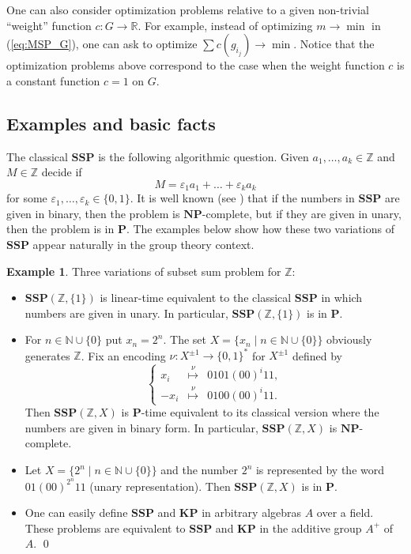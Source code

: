 \documentclass[10pt]{amsart}
\theoremstyle{definition}
\newtheorem{example}[theorem]{Example}
\def\P{{\mathbf{P}}}
\def\NP{{\mathbf{NP}}}
\def\SSP{{\mathbf{SSP}}}
\def\KP{{\mathbf{KP}}}
\begin{document}
\medskip

One can also consider optimization problems relative to  a given non-trivial ``weight'' function $c:G \to \mathbb{R}$. For example, instead of optimizing $m\to\min$ in (\ref{eq:MSP_G}), one can ask to optimize $\sum c(g_{i_j})\to\min$. Notice that the optimization problems above correspond to the case when the weight function $c$ is a constant function $c = 1$ on $G$.





\subsection{Examples and basic facts}
\label{sec:general-properties}

The classical $\SSP$  is the following algorithmic question.
Given $a_1,\ldots,a_k\in \mathbb Z$ and $M\in \mathbb Z$ decide if
    $$M=\varepsilon_1 a_1+\ldots+\varepsilon_k a_k$$
for some $\varepsilon_1,\ldots,\varepsilon_k \in \{0,1\}$.
It is well known (see \cite{GJ,Papa,Papadimitriou-Steiglitz:1998})
that if the numbers in $\SSP$ are given in  binary, then
the problem is $\NP$-complete, but if they are given in unary,
then the problem is  in $\P$. The examples below show how these
two variations of $\SSP$  appear naturally in the group theory context.

\begin{example}\label{ex:inf_gen_set}
Three variations of subset sum problem for $\mathbb Z$:
\begin{itemize}
    \item
$\SSP(\mathbb Z,\{1\})$
is linear-time equivalent  to the   classical $\SSP$  in which numbers
are  given in unary.
In particular, $\SSP(\mathbb Z,\{1\})$ is  in $\P$.
    \item
For $n\in\mathbb N \cup\{0\}$ put $x_n=2^n$. The set
$X = \{x_n \mid n\in\mathbb N \cup\{0\}\}$
obviously generates $\mathbb Z$.
Fix an encoding $\nu:X^{\pm1} \to \{0,1\}^*$
for $X^{\pm1}$ defined by
$$
\left\{
\begin{array}{rcl}
x_i &\stackrel{\nu}{\mapsto}& 0101(00)^i11,\\
-x_i &\stackrel{\nu}{\mapsto}& 0100(00)^i11.
\end{array}
\right.
$$
Then $\SSP(\mathbb Z,X)$ is  $\P$-time equivalent to its  classical version where the  numbers are given in binary form.
In particular, $\SSP(\mathbb Z,X)$ is   $\NP$-complete.
    \item
Let $X = \{2^n \mid n\in\mathbb N \cup\{0\}\}$ and the number
$2^n$ is represented by the word $01(00)^{2^n}11$ (unary representation).
Then $\SSP(\mathbb Z,X)$ is  in $\P$.
    \item
One can easily define $\SSP$ and $\KP$ in arbitrary algebras $A$ over a field. These problems are equivalent to  $\SSP$ and $\KP$ in the additive group $A^+$ of $A$.
\qed
\end{itemize}
\end{example}
\end{document}
